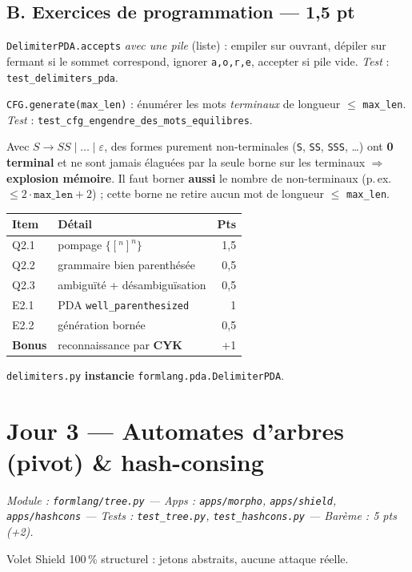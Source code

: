 \documentclass[11pt,a4paper]{scrartcl}
\begin{document}
\subsection{B. Exercices de programmation — 1,5 pt}
\begin{description}[leftmargin=1.8em,style=nextline]
  \item[E2.1 (1) — automate à pile.] \texttt{DelimiterPDA.accepts} \emph{avec une pile}
    (liste) : empiler sur ouvrant, dépiler sur fermant si le sommet correspond, ignorer
    \texttt{a,o,r,e}, accepter si pile vide. \emph{Test} : \texttt{test\_delimiters\_pda}.
  \item[E2.2 (0,5) — génération bornée.] \texttt{CFG.generate(max\_len)} : énumérer les mots
    \emph{terminaux} de longueur $\le$ \texttt{max\_len}. \emph{Test} :
    \texttt{test\_cfg\_engendre\_des\_mots\_equilibres}.
\end{description}
\begin{notion}
Avec $S\to SS\mid\dots\mid\varepsilon$, des formes purement non-terminales (\texttt{S},
\texttt{SS}, \texttt{SSS}, \dots) ont \textbf{0 terminal} et ne sont jamais élaguées par la
seule borne sur les terminaux $\Rightarrow$ \textbf{explosion mémoire}. Il faut borner
\textbf{aussi} le nombre de non-terminaux (p.\,ex.\ $\le 2\cdot\texttt{max\_len}+2$) ; cette
borne ne retire aucun mot de longueur $\le$ \texttt{max\_len}.
\end{notion}
\begin{center}\small
\begin{tabular}{@{}llr@{}}
\toprule Item & Détail & Pts\\\midrule
Q2.1 & pompage $\{[^{n}]^{n}\}$ & 1,5\\
Q2.2 & grammaire bien parenthésée & 0,5\\
Q2.3 & ambiguïté + désambiguïsation & 0,5\\
E2.1 & PDA \texttt{well\_parenthesized} & 1\\
E2.2 & génération bornée & 0,5\\
\textbf{Bonus} & reconnaissance par \textbf{CYK} & +1\\
\bottomrule
\end{tabular}
\end{center}
\begin{gate}\texttt{delimiters.py} \textbf{instancie} \texttt{formlang.pda.DelimiterPDA}.\end{gate}
\clearpage
\section{Jour 3 — Automates d'arbres (pivot) \& hash-consing}
\emph{Module : \texttt{formlang/tree.py} — Apps : \texttt{apps/morpho}, \texttt{apps/shield},
\texttt{apps/hashcons} — Tests : \texttt{test\_tree.py}, \texttt{test\_hashcons.py} —
Barème : 5 pts (+2).}
\begin{ethique}Volet Shield 100\,\% structurel : jetons abstraits, aucune attaque réelle.\end{ethique}
\end{document}
